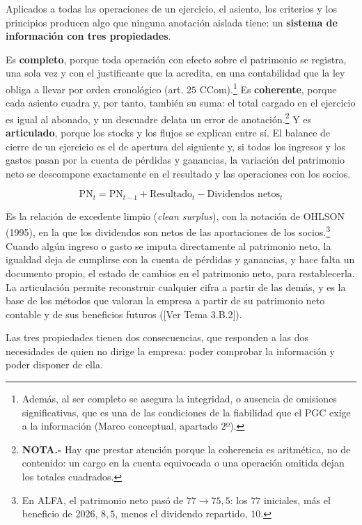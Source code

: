 \documentclass[10pt,a4paper]{article}
\newcommand{\authorfont}[1]{{\fontfamily{EBGaramond-TLF}\selectfont #1}}
\begin{document}
Aplicados a todas las operaciones de un ejercicio, el asiento, los criterios y los principios producen algo que ninguna anotación aislada tiene: un \textbf{sistema de información con tres propiedades}.

Es \textbf{completo}, porque toda operación con efecto sobre el patrimonio se registra, una sola vez y con el justificante que la acredita, en una contabilidad que la ley obliga a llevar por orden cronológico (art. $25$ CCom).\footnote{%
  Además, al ser completo se asegura la integridad, o ausencia de omisiones significativas, que es una de las condiciones de la fiabilidad que el PGC exige a la información (Marco conceptual, apartado $2$º).
} Es \textbf{coherente}, porque cada asiento cuadra y, por tanto, también su suma: el total cargado en el ejercicio es igual al abonado, y un descuadre delata un error de anotación.\footnote{%
  \textbf{NOTA.-} Hay que prestar atención porque la coherencia es aritmética, no de contenido: un cargo en la cuenta equivocada o una operación omitida dejan los totales cuadrados.
} Y es \textbf{articulado}, porque los stocks y los flujos se explican entre sí. El balance de cierre de un ejercicio es el de apertura del siguiente y, si todos los ingresos y los gastos pasan por la cuenta de pérdidas y ganancias, la variación del patrimonio neto se descompone exactamente en el resultado y las operaciones con los socios. 

$$\text{PN}_t=\text{PN}_{t-1}+\text{Resultado}_t-\text{Dividendos netos}_t$$

Es la relación de excedente limpio (\textit{clean surplus}), con la notación de OHLSON (1995), en la que los dividendos son netos de las aportaciones de los socios.\footnote{%
  En ALFA, el patrimonio neto pasó de $77\to 75{,}5$: los $77$ iniciales, más el beneficio de 2026, $8{,}5$, menos el dividendo repartido, $10$. 
} Cuando algún ingreso o gasto se imputa directamente al patrimonio neto, la igualdad deja de cumplirse con la cuenta de pérdidas y ganancias, y hace falta un documento propio, el estado de cambios en el patrimonio neto, para restablecerla. La articulación permite reconstruir cualquier cifra a partir de las demás, y es la base de los métodos que valoran la empresa a partir de su patrimonio neto contable y de sus beneficios futuros ([\authorfont{Ver Tema 3.B.2}]).

Las tres propiedades tienen dos consecuencias, que responden a las dos necesidades de quien no dirige la empresa: poder comprobar la información y poder disponer de ella.
\end{document}
